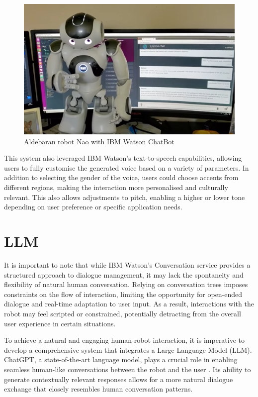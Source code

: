 \begin{figure}[!htb]
    \centering{}
    \includegraphics[scale=0.25]{aed_images/nao_with_chatbot.png}
    \caption{Aldebaran robot Nao with IBM Watson ChatBot}
    \label{figure:naochatbot}
\end{figure}

This system also leveraged IBM Watson's text-to-speech capabilities, allowing users to fully customise the generated voice based on a variety of parameters. In addition to selecting the gender of the voice, users could choose accents from different regions, making the interaction more personalised and culturally relevant. This also allows adjustments to pitch, enabling a higher or lower tone depending on user preference or specific application needs.

\section{LLM}

It is important to note that while IBM Watson's Conversation service provides a structured approach to dialogue management, it may lack the spontaneity and flexibility of natural human conversation. Relying on conversation trees imposes constraints on the flow of interaction, limiting the opportunity for open-ended dialogue and real-time adaptation to user input. As a result, interactions with the robot may feel scripted or constrained, potentially detracting from the overall user experience in certain situations.

To achieve a natural and engaging human-robot interaction, it is imperative to develop a comprehensive system that integrates a Large Language Model (LLM). ChatGPT, a state-of-the-art language model, plays a crucial role in enabling seamless human-like conversations between the robot and the user \cite{chatgpt}. Its ability to generate contextually relevant responses allows for a more natural dialogue exchange that closely resembles human conversation patterns.

